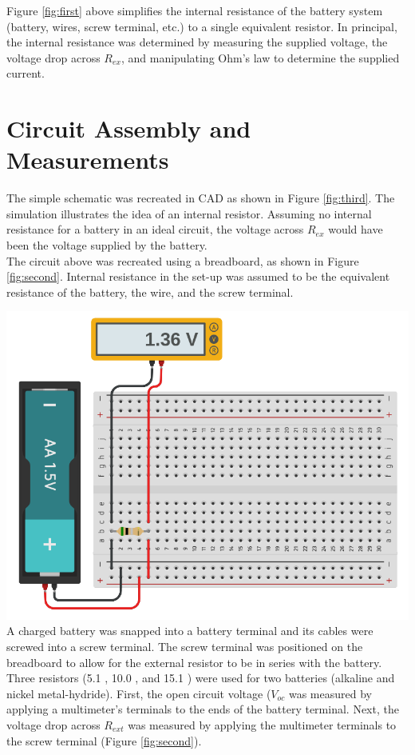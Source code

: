 \documentclass[journal]{IEEEtran}
\begin{document}
\noindent Figure \ref{fig:first} above simplifies the internal resistance of the battery system (battery, wires, screw terminal, etc.) to a single equivalent resistor. In principal, the internal resistance was determined by measuring the supplied voltage,  the voltage drop across $R_{ex}$, and manipulating Ohm's law to determine the supplied current. 


\smallskip
\section{Circuit Assembly and Measurements}

\noindent The simple schematic was recreated in CAD as shown in Figure \ref{fig:third}. The simulation illustrates the idea of an internal resistor. Assuming no internal resistance for a battery in an ideal circuit, the voltage across $R_{ex}$ would have been the voltage supplied by the battery.\\

\noindent The circuit above was recreated using a breadboard, as shown in Figure \ref{fig:second}. Internal resistance in the set-up was assumed to be the equivalent resistance of the battery, the wire, and the screw terminal.

\begingroup
    \medskip
    \centering
    \includegraphics[width=\columnwidth]{images/lab3_2.png}
    \label{fig:third}
    \medskip
\endgroup
\\

\noindent A charged battery was snapped into a battery terminal and its cables were screwed into a screw terminal. The screw terminal was positioned on the breadboard to allow for the external resistor to be in series with the battery. Three resistors (5.1 \ohm, 10.0 \ohm, and 15.1 \ohm) were used for two batteries (alkaline and nickel metal-hydride). First, the open circuit voltage ($V_{oc}$ was measured by applying a multimeter's terminals to the ends of the battery terminal. Next, the voltage drop across $R_{ext}$ was measured by applying the multimeter terminals to the screw terminal (Figure \ref{fig:second}).
\end{document}
